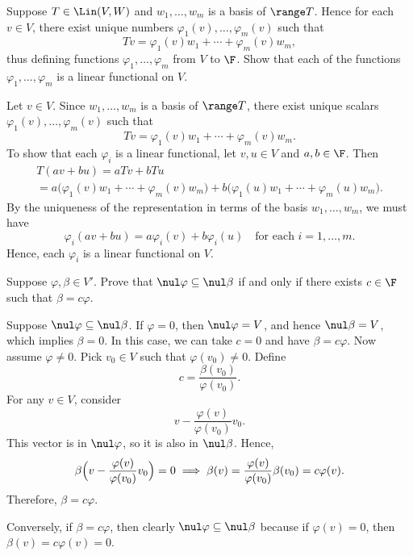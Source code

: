 \begin{exc}
\begin{exercise}
Suppose $T\in\Lin(V,W)$ and $w_1,\dots,w_m$ is a basis of $\range T$. Hence for
each $v\in V$, there exist unique numbers $\varphi_1(v),\dots,\varphi_m(v)$ such
that
\[ Tv = \varphi_1(v)w_1+\cdots+\varphi_m(v)w_m, \]
thus defining functions $\varphi_1,\dots,\varphi_m$ from $V$ to $\F$. Show that
each of the functions $\varphi_1,\dots,\varphi_m$ is a linear functional on $V$.
\end{exercise}
\begin{solution}
Let $v\in V$. Since $w_1,\dots,w_m$ is a basis of $\range T$, there exist unique
scalars $\varphi_1(v),\dots,\varphi_m(v)$ such that
\[ Tv = \varphi_1(v)w_1+\cdots+\varphi_m(v)w_m. \]
To show that each $\varphi_i$ is a linear functional, let $v,u\in V$ and
$a,b\in\F$. Then
\begin{multline*}
T(av+bu) = aTv+bTu\\
 = a\bigl(\varphi_1(v)w_1+\cdots+\varphi_m(v)w_m\bigr)
   +b\bigl(\varphi_1(u)w_1+\cdots+\varphi_m(u)w_m\bigr).
\end{multline*}
By the uniqueness of the representation in terms of the basis $w_1,\dots,w_m$,
we must have
\[ \varphi_i(av+bu) = a\varphi_i(v)+b\varphi_i(u) \quad\text{for each }
   i=1,\dots,m. \]
Hence, each $\varphi_i$ is a linear functional on $V$.
\end{solution}

\begin{exercise}
Suppose $\varphi,\beta\in V'$. Prove that $\nul\varphi\subseteq\nul\beta$ if and
only if there exists $c\in\F$ such that $\beta=c\varphi$.
\end{exercise}
\begin{solution}
Suppose $\nul\varphi\subseteq\nul\beta$. If $\varphi=0$, then $\nul\varphi=V$,
and hence $\nul\beta=V$, which implies $\beta=0$. In this case, we can take
$c=0$ and have $\beta=c\varphi$. Now assume $\varphi\ne0$. Pick $v_0\in V$ such
that $\varphi(v_0)\ne0$. Define
\[ c = \frac{\beta(v_0)}{\varphi(v_0)}. \]
For any $v\in V$, consider
\[ v-\frac{\varphi(v)}{\varphi(v_0)}v_0. \]
This vector is in $\nul\varphi$, so it is also in $\nul\beta$. Hence,
\[ \beta\Bigl(v-\frac{\varphi(v)}{\varphi(v_0)}v_0\Bigr) = 0
   \implies \beta(v) = \frac{\varphi(v)}{\varphi(v_0)}\beta(v_0) = c\varphi(v). \]
Therefore, $\beta=c\varphi$.

Conversely, if $\beta=c\varphi$, then clearly $\nul\varphi\subseteq\nul\beta$
because if $\varphi(v)=0$, then $\beta(v)=c\varphi(v)=0$.
\end{solution}


\end{exc}
